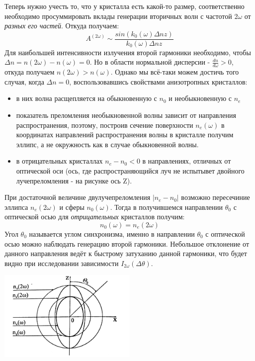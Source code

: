\documentclass[a4paper,10pt]{article} %
\begin{document}
Теперь нужно учесть то, что у кристалла есть какой-то размер, соответственно необходимо просуммировать вклады генерации вторичных волн с частотой $2 \omega$ от \textit{разных его частей}. Откуда получаем:
\begin{equation}
A^{(2 \omega)} \sim \frac{sin(k_0(\omega) \Delta n z)}{k_0(\omega) \Delta n z}
\end{equation}
Для наибольшей интенсивности излучения второй гармоники необходимо, чтобы $\Delta n = n(2 \omega) - n(\omega) = 0$. Но в области нормальной дисперсии - $\frac{dn}{d \omega} > 0$, откуда получаем $n(2 \omega) > n(\omega)$.
Однако мы всё-таки можем достичь того случая, когда $\Delta n =0$, воспользовавшись свойствами анизотропных кристаллов:
\begin{itemize}
\item в них волна расщепляется на обыкновенную с $n_0$ и необыкновенную с $n_e$
\item показатель преломления необыкновенной волны зависит от направления распространения, поэтому, построив сечение поверхности $n_e(\omega)$ в координатах направлений распространения волны в кристалле получим эллипс, а не окружность как в случае обыкновенной волны.
\item в отрицательных кристаллах $n_e - n_0 < 0$ в направлениях, отличных от оптической оси (ось, где распространяющийся луч не испытывет двойного лучепреломления - на рисунке ось Z).
\end{itemize}

При достаточной величине двулучепреломления $|n_e - n_0|$ возможно пересечиние эллипса $n_e(2 \omega)$ и сферы $n_0(\omega)$. Тогда в получившемся направлении $\theta_0$ с оптической осью для \textit{отрицательных} кристаллов получим:
\begin{equation}
n_0(\omega) = n_e(2 \omega)
\end{equation}
Угол $\theta_0$ называется углом синхронизма, именно в направлении $\theta_0$ с оптической осью можно наблюдать генерацию второй гармоники. Небольшое отклонение от данного направления ведёт к быстрому затуханию данной гармоники, что будет видно при исследовании зависимости $I_{2 \omega} (\Delta \theta)$.

\begin{center}
\includegraphics[width = 0.5\textwidth]{images/ellips}\\
\end{center}
\end{document}

